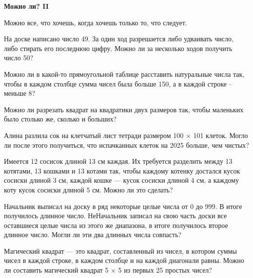 \centerline{\bf \Huge Можно ли? II}

\begin{flushright}
        \scriptsize{Можно все, что хочешь, когда хочешь только то, что следует.}
\end{flushright}

  На доске написано число 49. За один ход разрешается либо удваивать число, либо стирать его последнюю цифру. Можно ли за несколько ходов получить число 50?

 Можно ли в какой-то прямоугольной таблице расставить натуральные числа так, чтобы в каждом столбце сумма чисел была больше 150, а в каждой строке – меньше 8?

 Можно ли разрезать квадрат на квадратики двух размеров так, чтобы маленьких было столько же, сколько и больших?

 Алина разлила сок на клетчатый лист тетради размером 100 × 101 клеток.
Могло ли после этого получиться, что испачканных клеток на 2025 больше, чем чистых?


 Имеется 12 сосисок длиной 13 см каждая. Их
требуется разделить между 13 котятами, 13 кошками и 13 котами так, чтобы каждому
котенку достался кусок сосиски длиной 3 см, каждой кошке — кусок сосиски длиной
4 см, а каждому коту кусок сосиски длиной 5 см. Можно ли это сделать?


 Начальник выписал на доску в ряд некоторые целые числа от 0 до
999. В итоге получилось длинное число. НеНачальник записал на свою часть доски все оставшиеся
целые числа из этого же диапазона, в итоге получилось второе длинное число. Могли ли эти
два длинных числа совпасть?


 Магический квадрат — это квадрат, составленный из чисел, в котором суммы чисел в каждой
строке, в каждом столбце и на каждой диагонали равны. Можно ли составить магический
квадрат 5 $\times$ 5 из первых 25 простых чисел?

